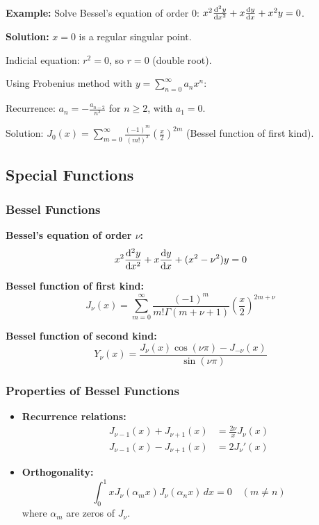 \documentclass[12pt,a4paper]{article}
\begin{document}
\begin{examplebox}
\textbf{Example:} Solve Bessel's equation of order 0: $x^2\dv[2]{y}{x} + x\dv{y}{x} + x^2 y = 0$.

\textbf{Solution:} $x = 0$ is a regular singular point.

Indicial equation: $r^2 = 0$, so $r = 0$ (double root).

Using Frobenius method with $y = \sum_{n=0}^{\infty} a_n x^n$:

Recurrence: $a_n = -\frac{a_{n-2}}{n^2}$ for $n \geq 2$, with $a_1 = 0$.

Solution: $J_0(x) = \sum_{m=0}^{\infty} \frac{(-1)^m}{(m!)^2}\left(\frac{x}{2}\right)^{2m}$ (Bessel function of first kind).
\end{examplebox}

\subsection{Special Functions}
\subsubsection{Bessel Functions}
\begin{formulabox}
\textbf{Bessel's equation of order $\nu$:}
\begin{equation}
x^2\dv[2]{y}{x} + x\dv{y}{x} + (x^2 - \nu^2)y = 0
\end{equation}

\textbf{Bessel function of first kind:}
\begin{equation}
J_\nu(x) = \sum_{m=0}^{\infty} \frac{(-1)^m}{m!\Gamma(m+\nu+1)}\left(\frac{x}{2}\right)^{2m+\nu}
\end{equation}

\textbf{Bessel function of second kind:}
\begin{equation}
Y_\nu(x) = \frac{J_\nu(x)\cos(\nu\pi) - J_{-\nu}(x)}{\sin(\nu\pi)}
\end{equation}
\end{formulabox}

\subsubsection{Properties of Bessel Functions}
\begin{itemize}
    \item \textbf{Recurrence relations:}
    \begin{align}
    J_{\nu-1}(x) + J_{\nu+1}(x) &= \frac{2\nu}{x}J_\nu(x) \\
    J_{\nu-1}(x) - J_{\nu+1}(x) &= 2J_\nu'(x)
    \end{align}
    \item \textbf{Orthogonality:}
    \begin{equation}
    \int_0^1 x J_\nu(\alpha_m x) J_\nu(\alpha_n x) \, dx = 0 \quad (m \neq n)
    \end{equation}
    where $\alpha_m$ are zeros of $J_\nu$.
\end{itemize}
\end{document}
